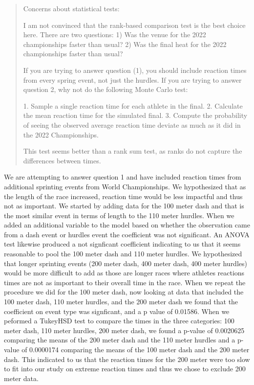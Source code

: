 \documentclass[12pt]{article}
\newenvironment{comment}%
{\begin{quotation}\noindent\small\it\color{darkblue}\ignorespaces%
}{\end{quotation}}
\begin{document}
\begin{comment}
Concerns about statistical tests:

I am not convinced that the rank-based comparison test is the best choice here.
There are two questions: 1) Was the venue for the 2022 championships faster than
usual? 2) Was the final heat for the 2022 championships faster than usual?

If you are trying to answer question (1), you should include reaction times from
every spring event, not just the hurdles. If you are trying to answer question
2, why not do the following Monte Carlo test:

1. Sample a single reaction time for each athlete in the final.
2. Calculate the mean reaction time for the simulated final.
3. Compute the probability of seeing the observed average reaction time deviate
as much as it did in the 2022 Championships.

This test seems better than a rank sum test, as ranks do not capture the
differences between times.

\end{comment}

We are attempting to answer question 1 and have included reaction times from
additional sprinting events from World Championships.  We hypothesized that
as the length of the race increased, reaction time would be less impactful and
thus not as important. We started by adding data for the 100 meter dash and that
is the most similar event in terms of length to the 110 meter hurdles.  When we
added an additional variable to the model based on whether the observation came
from a dash event or hurdles event the coefficient was not significant.  An 
ANOVA test likewise produced a not signficant coefficient indicating to us that
it seems reasonable to pool the 100 meter dash and 110 meter hurdles.  We
hypothesized that longer sprinting events (200 meter dash, 400 meter dash, 400
meter hurdles) would be more difficult to add as those are longer races where
athletes reactions times are not as important to their overall time in the race.
When we repeat the procedure we did for the 100 meter dash, now looking at data
that included the 100 meter dash, 110 meter hurdles, and the 200 meter dash we
found that the coefficient on event type was signficant, and a p value of 0.01586.
When we peformed a TukeyHSD test to compare the times in the three categories:
100 meter dash, 110 meter hurdles, 200 meter dash, we found a p-value of
0.0020625 comparing the means of the 200 meter dash and the 110 meter hurdles
and a p-value of 0.0000174 comparing the means of the 100 meter dash and the 200
meter dash.  This indicated to us that the reaction times for the 200 meter were
too slow to fit into our study on extreme reaction times and thus we chose to
exclude 200 meter data.
\end{document}
